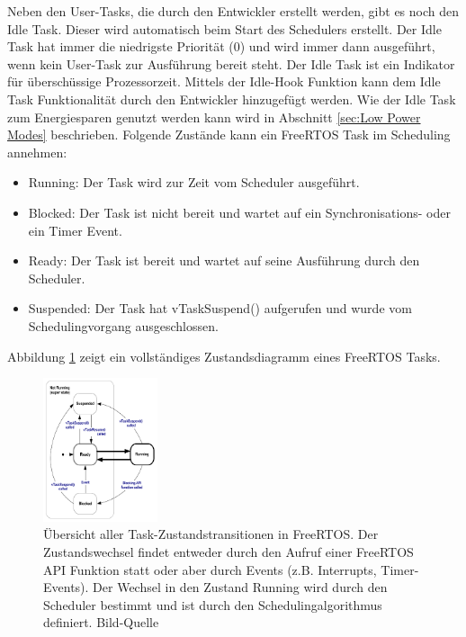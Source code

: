 \newline
Neben den User-Tasks, die durch den Entwickler erstellt werden, gibt es noch den Idle Task. Dieser wird automatisch beim Start des Schedulers erstellt. Der Idle Task hat immer die niedrigste Priorität (0) und wird immer dann ausgeführt, wenn kein User-Task zur Aus\-füh\-rung bereit steht. Der Idle Task ist ein Indikator für über\-schüss\-ige Prozessorzeit. Mittels der Idle-Hook Funktion kann dem Idle Task Funktionalität durch den Entwickler hinzugefügt werden. Wie der Idle Task zum Energiesparen genutzt werden kann wird in Abschnitt \ref{sec:Low Power Modes} beschrieben.
Folgende Zu\-stän\-de kann ein FreeRTOS Task im Scheduling annehmen: 
\begin{itemize}
	\item Running: Der Task wird zur Zeit vom Scheduler ausgeführt.
	\item Blocked: Der Task ist nicht bereit und wartet auf ein Synchronisations- oder ein Timer Event.
	\item Ready: Der Task ist bereit und wartet auf seine Aus\-füh\-rung durch den Scheduler.
	\item Suspended: Der Task hat vTaskSuspend() aufgerufen und wurde vom Schedulingvorgang ausgeschlossen.
\end{itemize}
 Abbildung \ref{fig:TaskStates} zeigt ein vollständiges Zustandsdiagramm eines FreeRTOS Tasks.
\begin{figure}[ht!]
	\centering
		\includegraphics[width=0.3\textwidth]{Pictures/FreeRTOSOrg/taskStates.png}
	\caption{Übersicht aller Task-Zustandstransitionen in FreeRTOS. Der Zustandswechsel findet entweder durch den Aufruf einer FreeRTOS API Funktion statt oder aber durch Events (z.B. Interrupts, Timer-Events). Der Wechsel in den Zustand Running wird durch den Scheduler bestimmt und ist durch den Schedulingalgorithmus definiert.  Bild-Quelle~\protect{}}
	\label{fig:TaskStates}
\end{figure} 
